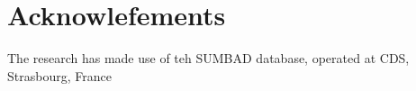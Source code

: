 \chapter{Acknowlefements}

The research has made use of teh SUMBAD database, operated at CDS, Strasbourg, France